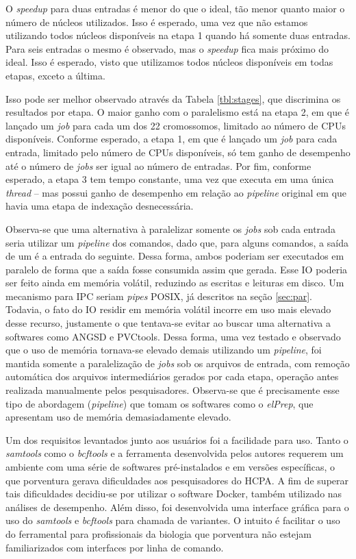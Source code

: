 \documentclass[cic,tc]{iiufrgs}
\begin{document}
O \textit{speedup} para duas entradas é menor do que o ideal, tão menor quanto
maior o número de núcleos utilizados. Isso é esperado, uma vez que não estamos
utilizando todos núcleos disponíveis na etapa 1 quando há somente duas
entradas. Para seis entradas o mesmo é observado, mas o \textit{speedup} fica
mais próximo do ideal. Isso é esperado, visto que utilizamos todos núcleos
disponíveis em todas etapas, exceto a última.

Isso pode ser melhor observado através da Tabela \ref{tbl:stages}, que
discrimina os resultados por etapa. O maior ganho com o paralelismo está na
etapa 2, em que é lançado um \textit{job} para cada um dos 22 cromossomos,
limitado ao número de CPUs disponíveis. Conforme esperado, a etapa 1, em que é
lançado um \textit{job} para cada entrada, limitado pelo número de CPUs
disponíveis, só tem ganho de desempenho até o número de \textit{jobs} ser igual
ao número de entradas. Por fim, conforme esperado, a etapa 3 tem tempo
constante, uma vez que executa em uma única \textit{thread} -- mas possui ganho
de desempenho em relação ao \textit{pipeline} original em que havia uma etapa
de indexação desnecessária.

Observa-se que uma alternativa à paralelizar somente os \textit{jobs} sob cada
entrada seria utilizar um \textit{pipeline} dos comandos, dado que, para alguns
comandos, a saída de um é a entrada do seguinte. Dessa forma, ambos poderiam
ser executados em paralelo de forma que a saída fosse consumida assim que
gerada. Esse IO poderia ser feito ainda em memória volátil, reduzindo as
escritas e leituras em disco. Um mecanismo para IPC seriam \textit{pipes} POSIX, já
descritos na seção \ref{sec:par}. Todavia, o fato do IO residir em memória
volátil incorre em uso mais elevado desse recurso, justamente o que tentava-se
evitar ao buscar uma alternativa a softwares como ANGSD e PVCtools.
Dessa forma, uma vez testado e observado que o uso de memória tornava-se
elevado demais utilizando um \textit{pipeline}, foi mantida somente a
paralelização de \textit{jobs} sob os arquivos de entrada, com remoção
automática dos arquivos intermediários gerados por cada etapa, operação antes
realizada manualmente pelos pesquisadores. Observa-se que é precisamente esse
tipo de abordagem (\textit{pipeline}) que tomam os softwares como o
\textit{elPrep}, que apresentam uso de memória demasiadamente elevado.

Um dos requisitos levantados junto aos usuários foi a facilidade para uso.
Tanto o \textit{samtools} como o \textit{bcftools} e a ferramenta desenvolvida
pelos autores requerem um ambiente com uma série de softwares pré-instalados e
em versões específicas, o que porventura gerava dificuldades aos pesquisadores
do HCPA. A fim de superar tais dificuldades decidiu-se por utilizar o software
Docker, também utilizado nas análises de desempenho. Além disso, foi
desenvolvida uma interface gráfica para o uso do \textit{samtools} e
\textit{bcftools} para chamada de variantes. O intuito é facilitar o uso do
ferramental para profissionais da biologia que porventura não estejam
familiarizados com interfaces por linha de comando.
\end{document}
